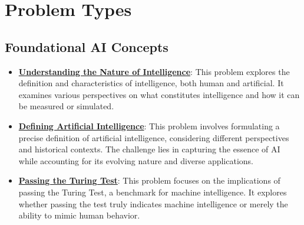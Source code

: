 \documentclass{article}%
\begin{document}
%
\section{Problem Types}%
\label{sec:ProblemTypes}%
\subsection{Foundational AI Concepts}%
\label{subsec:FoundationalAIConcepts}%
\begin{itemize}[leftmargin=*]%
\item \href{https://purdue.brightspace.com/d2l/common/assets/pdfjs-d2l-dist/1.0.14-legacy/web/viewer.html?file=%2Fcontent%2Fenforced%2F1095467-wl.202510.CS.24300.001%2F02L2-Intro.pdf%3Fou%3D1095467&lang=en-us&container=d2l-fileviewer-rendered-pdf&fullscreen=d2l-fileviewer-rendered-pdf-dialog&height=667#page=5}{\textbf{Understanding the Nature of Intelligence}}: This problem explores the definition and characteristics of intelligence, both human and artificial. It examines various perspectives on what constitutes intelligence and how it can be measured or simulated.%
\item \href{https://purdue.brightspace.com/d2l/common/assets/pdfjs-d2l-dist/1.0.14-legacy/web/viewer.html?file=%2Fcontent%2Fenforced%2F1095467-wl.202510.CS.24300.001%2F02L2-Intro.pdf%3Fou%3D1095467&lang=en-us&container=d2l-fileviewer-rendered-pdf&fullscreen=d2l-fileviewer-rendered-pdf-dialog&height=667#page=5}{\textbf{Defining Artificial Intelligence}}: This problem involves formulating a precise definition of artificial intelligence, considering different perspectives and historical contexts. The challenge lies in capturing the essence of AI while accounting for its evolving nature and diverse applications.%
\item \href{https://purdue.brightspace.com/d2l/common/assets/pdfjs-d2l-dist/1.0.14-legacy/web/viewer.html?file=%2Fcontent%2Fenforced%2F1095467-wl.202510.CS.24300.001%2F02L2-Intro.pdf%3Fou%3D1095467&lang=en-us&container=d2l-fileviewer-rendered-pdf&fullscreen=d2l-fileviewer-rendered-pdf-dialog&height=667#page=6}{\textbf{Passing the Turing Test}}: This problem focuses on the implications of passing the Turing Test, a benchmark for machine intelligence. It explores whether passing the test truly indicates machine intelligence or merely the ability to mimic human behavior.%
\end{itemize}

%
\end{document}
